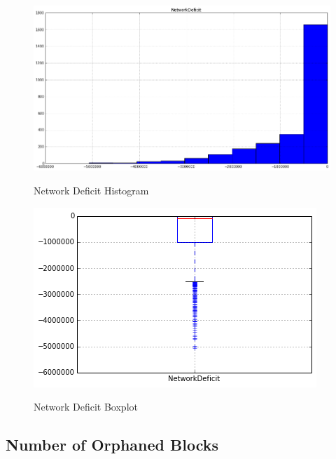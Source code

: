 \begin{figure}[bth]
  \myfloatalign
  {\includegraphics[width=1\linewidth]
    {gfx/network-deficit-histogram}}
  \caption{Network Deficit Histogram}
  \label{fig:network-deficit-histogram}
\end{figure}

\begin{figure}[bth]
  \myfloatalign
  {\includegraphics[width=1\linewidth]
    {gfx/network-deficit-boxplot}}
  \caption{Network Deficit Boxplot}
  \label{fig:network-deficit-boxplot}
\end{figure}

\clearpage

\subsection{Number of Orphaned Blocks}
\label{sec:n-orphaned-blocks}

